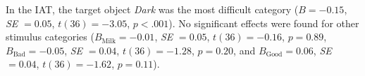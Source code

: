 \documentclass[12pt]{book}
\begin{document}
In the IAT, the target object \emph{Dark} was the most difficult category ($B=-0.15$, \emph{SE}  $=0.05$, $t(36) = -3.05$, $p <.001$). 
No significant effects were found for other stimulus categories ($B_{\text{Milk}} =-0.01$, \emph{SE}  $= 0.05$, $t(36) = -0.16$, $p = 0.89$, $B_{\text{Bad}} = -0.05$, \emph{SE}  $= 0.04$, $t(36) = -1.28$, $p = 0.20$, and $B_{\text{Good}} = 0.06$, \emph{SE}  $=0.04$, $t(36) = -1.62$, $p = 0.11$).
\begin{landscape}
	\thispagestyle{plain}
	\begin{table}[h!]
		\centering\doublespacing
		\caption{Single measure models: Stimuli easiness estimates ($b_{sm}$) and time intensity estimates ($\delta_{sm}$).}
		\label{tab:singlestim-parameters} 
\end{table}
\end{landscape}
\end{document}
